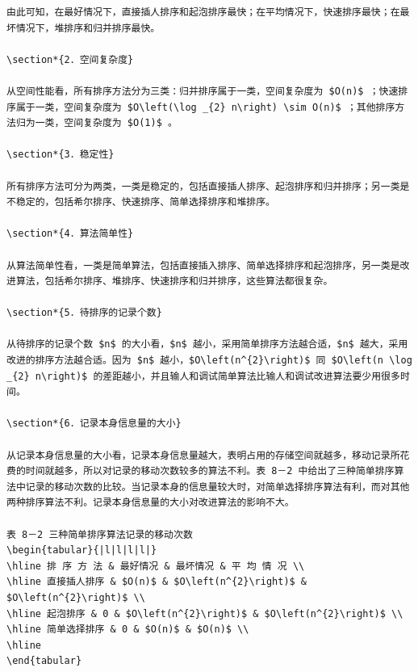 \documentclass[10pt]{article}
\begin{document}
\begin{verbatim}
由此可知，在最好情况下，直接插人排序和起泡排序最快；在平均情况下，快速排序最快；在最坏情况下，堆排序和归并排序最快。

\section*{2．空间复杂度}

从空间性能看，所有排序方法分为三类：归并排序属于一类，空间复杂度为 $O(n)$ ；快速排序属于一类，空间复杂度为 $O\left(\log _{2} n\right) \sim O(n)$ ；其他排序方法归为一类，空间复杂度为 $O(1)$ 。

\section*{3．稳定性}

所有排序方法可分为两类，一类是稳定的，包括直接插人排序、起泡排序和归并排序；另一类是不稳定的，包括希尔排序、快速排序、简单选择排序和堆排序。

\section*{4．算法简单性}

从算法简单性看，一类是简单算法，包括直接插入排序、简单选择排序和起泡排序，另一类是改进算法，包括希尔排序、堆排序、快速排序和归并排序，这些算法都很复杂。

\section*{5．待排序的记录个数}

从待排序的记录个数 $n$ 的大小看，$n$ 越小，采用简单排序方法越合适，$n$ 越大，采用改进的排序方法越合适。因为 $n$ 越小，$O\left(n^{2}\right)$ 同 $O\left(n \log _{2} n\right)$ 的差距越小，并且输人和调试简单算法比输人和调试改进算法要少用很多时间。

\section*{6．记录本身信息量的大小}

从记录本身信息量的大小看，记录本身信息量越大，表明占用的存储空间就越多，移动记录所花费的时间就越多，所以对记录的移动次数较多的算法不利。表 8－2 中给出了三种简单排序算法中记录的移动次数的比较。当记录本身的信息量较大时，对简单选择排序算法有利，而对其他两种排序算法不利。记录本身信息量的大小对改进算法的影响不大。

表 8－2 三种简单排序算法记录的移动次数
\begin{tabular}{|l|l|l|l|}
\hline 排 序 方 法 & 最好情况 & 最坏情况 & 平 均 情 况 \\
\hline 直接插人排序 & $O(n)$ & $O\left(n^{2}\right)$ & $O\left(n^{2}\right)$ \\
\hline 起泡排序 & 0 & $O\left(n^{2}\right)$ & $O\left(n^{2}\right)$ \\
\hline 简单选择排序 & 0 & $O(n)$ & $O(n)$ \\
\hline
\end{tabular}


\end{verbatim}
\end{document}
